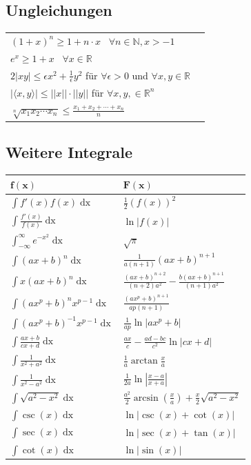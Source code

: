\documentclass[a4paper,10pt]{article}
\def\dx{\mathop{dx}}
\begin{document}
\subsection{Ungleichungen}
\begin{center}
  \begin{tabularx}{\linewidth}{>{\centering\arraybackslash}X>{\centering\arraybackslash}X}
    $(1+x)^n \geq 1+ n\cdot x$ \, $\forall n\in \mathbb{N}, x > -1$\\
    $e^x \geq 1 + x$ \, $\forall x\in \mathbb{R}$\\
    $2|xy| \leq \epsilon x^2 + \frac{1}{\epsilon} y^2$ für $\forall \epsilon > 0$ und $\forall x,y \in \mathbb{R}$\\
    $|\langle x,y \rangle| \leq ||x|| \cdot ||y||$ für $\forall x,y, \in \mathbb{R}^n$\\
    $\sqrt[n]{x_1 x_2 \cdots x_n} \leq \frac{x_1 + x_2 + \cdots + x_n}{n}$
  \end{tabularx}
\end{center}

\subsection{Weitere Integrale}
\begin{center}
 \begin{tabularx}{\linewidth}{>{\centering\arraybackslash}X>{\centering\arraybackslash}X}
  \toprule
  $\mathbf{f(x)}$ & $\mathbf{F(x)}$ \\
  \midrule
  $\int f'(x) f(x) \dx$ & $\frac{1}{2}(f(x))^2$ \\
  $\int \frac{f'(x)}{f(x)} \dx$ & $\ln|f(x)|$ \\
  $\int_{-\infty}^\infty e^{-x^2} \dx$ & $\sqrt{\pi}$ \\
  $\int (ax+b)^n \dx$ & $\frac{1}{a(n+1)}(ax+b)^{n+1}$ \\
  $\int x(ax+b)^n \dx$ & $\frac{(ax+b)^{n+2}}{(n+2)a^2} - \frac{b(ax+b)^{n+1}}{(n+1)a^2}$ \\
  $\int (ax^p+b)^n x^{p-1} \dx$ & $\frac{(ax^p+b)^{n+1}}{ap(n+1)}$ \\
  $\int (ax^p + b)^{-1} x^{p-1} \dx$ & $\frac{1}{ap} \ln |ax^p + b|$ \\
  $\int \frac{ax+b}{cx+d} \dx$ & $\frac{ax}{c} - \frac{ad-bc}{c^2} \ln |cx +d|$ \\
  $\int \frac{1}{x^2+a^2} \dx$ & $\frac{1}{a} \arctan \frac{x}{a}$ \\
  $\int \frac{1}{x^2 - a^2} \dx$ & $\frac{1}{2a} \ln\left| \frac{x-a}{x+a} \right|$ \\
  $\int \sqrt{a^2 - x^2} \dx $ & $\frac{a^2}{2} \arcsin(\frac{x}{a}) + \frac{x}{2} \sqrt{a^2 - x^2}$ \\
  $\int \csc(x) \dx $ & $\ln|\csc(x) + \cot(x)|$ \\
  $\int \sec(x) \dx $ & $\ln|\sec(x) + \tan(x)|$ \\
  $\int \cot(x) \dx $ & $\ln|\sin(x)|$ \\
  \bottomrule
 \end{tabularx} 
\end{center}
\end{document}
